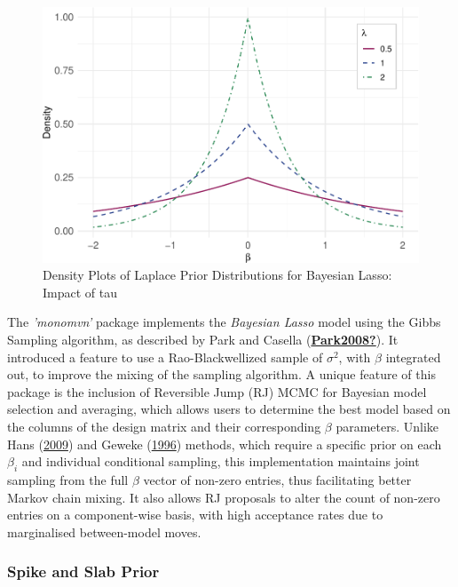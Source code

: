 \documentclass[
  11pt,
]{article}
\begin{document}
\begin{figure}

{\centering \includegraphics[width=0.85\linewidth]{dissertation_files/figure-latex/Bayesian Lasso Priors-1} 

}

\caption{Density Plots of Laplace Prior Distributions for Bayesian Lasso: Impact of tau}\label{fig:Bayesian Lasso Priors}
\end{figure}

The \emph{'monomvn'} package implements the \emph{Bayesian Lasso} model
using the Gibbs Sampling algorithm, as described by Park and Casella
(\protect\hyperlink{ref-Park2008}{\textbf{Park2008?}}). It introduced a
feature to use a Rao-Blackwellized sample of \(\sigma^2\), with
\(\beta\) integrated out, to improve the mixing of the sampling
algorithm. A unique feature of this package is the inclusion of
Reversible Jump (RJ) MCMC for Bayesian model selection and averaging,
which allows users to determine the best model based on the columns of
the design matrix and their corresponding \(\beta\) parameters. Unlike
Hans (\protect\hyperlink{ref-Hans2009}{2009}) and Geweke
(\protect\hyperlink{ref-Geweke1996}{1996}) methods, which require a
specific prior on each \(\beta_i\) and individual conditional sampling,
this implementation maintains joint sampling from the full \(\beta\)
vector of non-zero entries, thus facilitating better Markov chain
mixing. It also allows RJ proposals to alter the count of non-zero
entries on a component-wise basis, with high acceptance rates due to
marginalised between-model moves.

\subsubsection{Spike and Slab Prior}
\end{document}
